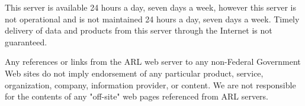 This server is available 24 hours a day, seven days a week, however this server
is not operational and is not maintained 24 hours a day, seven days a week.
Timely delivery of data and products from this server through the Internet is
not guaranteed.

Any references or links from the ARL web server to any non-Federal Government
Web sites do not imply endorsement of any particular product, service,
organization, company, information provider, or content. We are not responsible
for the contents of any "off-site" web pages referenced from ARL servers.


